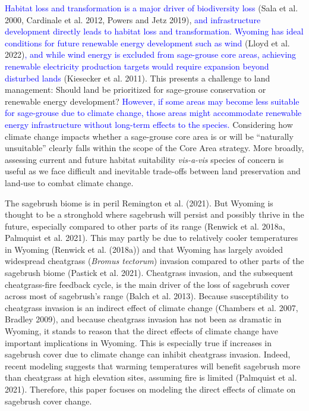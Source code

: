 \documentclass[
  12pt,
]{article}
\begin{document}
\textcolor{blue}{Habitat loss and transformation is a major driver of biodiversity loss} (Sala et al. 2000, Cardinale et al. 2012, Powers and Jetz 2019), \textcolor{blue}{and infrastructure development directly leads to habitat loss and transformation.}
\textcolor{blue}{Wyoming has ideal conditions for future renewable energy development such as wind} (Lloyd et al. 2022)\textcolor{blue}{, and while wind energy is excluded from sage-grouse core areas, achieving renewable electricity production targets would require expansion beyond disturbed lands} (Kiesecker et al. 2011).
This presents a challenge to land management: Should land be prioritized for sage-grouse conservation or renewable energy development?
\textcolor{blue}{However, if some areas may become less suitable for sage-grouse due to climate change, those areas might accommodate renewable energy infrastructure without long-term effects to the species.}
Considering how climate change impacts whether a sage-grouse core area is or will be ``naturally unsuitable'' clearly falls within the scope of the Core Area strategy.
More broadly, assessing current and future habitat suitability \emph{vis-a-vis} species of concern is useful as we face difficult and inevitable trade-offs between land preservation and land-use to combat climate change.

The sagebrush biome is in peril Remington et al. (2021).
But Wyoming is thought to be a stronghold where sagebrush will persist and possibly thrive in the future, especially compared to other parts of its range (Renwick et al. 2018a, Palmquist et al. 2021).
This may partly be due to relatively cooler temperatures in Wyoming (Renwick et al. (2018a)) and that Wyoming has largely avoided widespread cheatgrass (\emph{Bromus tectorum}) invasion compared to other parts of the sagebrush biome (Pastick et al. 2021).
Cheatgrass invasion, and the subsequent cheatgrass-fire feedback cycle, is the main driver of the loss of sagebrush cover across most of sagebrush's range (Balch et al. 2013).
Because susceptibility to cheatgrass invasion is an indirect effect of climate change (Chambers et al. 2007, Bradley 2009), and because cheatgrass invasion has not been as dramatic in Wyoming, it stands to reason that the direct effects of climate change have important implications in Wyoming.
This is especially true if increases in sagebrush cover due to climate change can inhibit cheatgrass invasion.
Indeed, recent modeling suggests that warming temperatures will benefit sagebrush more than cheatgrass at high elevation sites, assuming fire is limited (Palmquist et al. 2021).
Therefore, this paper focuses on modeling the direct effects of climate on sagebrush cover change.
\end{document}
